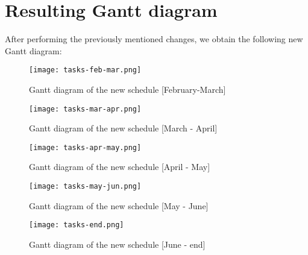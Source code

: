 \section{Resulting Gantt diagram}
After performing the previously mentioned changes, we obtain the following new Gantt diagram:
\begin{figure}[ht]
  \centering
  \texttt{[image: tasks-feb-mar.png]}
  \caption{Gantt diagram of the new schedule [February-March]}
  \label{fig:gantt-diagram-feb-mar}
\end{figure}
\begin{figure}[ht]
  \centering
  \texttt{[image: tasks-mar-apr.png]}
  \caption{Gantt diagram of the new schedule [March - April]}
  \label{fig:gantt-diagram-mar-apr}
\end{figure}
\begin{figure}[ht]
  \centering
  \texttt{[image: tasks-apr-may.png]}
  \caption{Gantt diagram of the new schedule [April - May]}
  \label{fig:gantt-diagram-apr-may}
\end{figure}
\begin{figure}[ht]
  \centering
  \texttt{[image: tasks-may-jun.png]}
  \caption{Gantt diagram of the new schedule [May - June]}
  \label{fig:gantt-diagram-may-jun}
\end{figure}
\begin{figure}[ht]
  \centering
  \texttt{[image: tasks-end.png]}
  \caption{Gantt diagram of the new schedule [June - end]}
  \label{fig:gantt-diagram-end}
\end{figure}
